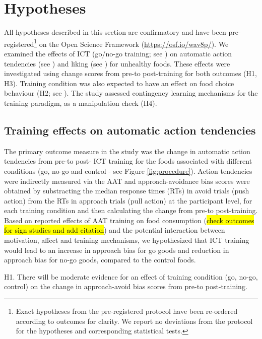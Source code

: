 \documentclass[man,floatsintext]{apa6}
\let\rmarkdownfootnote\footnote%
\def\footnote{\protect\rmarkdownfootnote}
\begin{document}
\section{Hypotheses}\label{hypotheses}

All hypotheses described in this section are confirmatory and have been
pre-registered\footnote{Exact hypotheses from the pre-registered protocol have been re-ordered according to outcomes for clarity. We report no deviations from the protocol for the hypotheses and corresponding statistical tests.}
on the Open Science Framework (\url{https://osf.io/wav8p/}). We examined
the effects of ICT (go/no-go training; see \textit{}) on
automatic action tendencies (see \textit{}) and liking (see
\textit{}) for unhealthy foods. These effects were
investigated using change scores from pre-to post-training for both
outcomes (H1, H3). Training condition was also expected to have an
effect on food choice behaviour (H2; see
\textit{}). The study assessed contingency learning
mechanisms for the training paradigm, as a manipulation check (H4).

\subsection{Training effects on automatic action
tendencies}\label{training-effects-on-automatic-action-tendencies}

The primary outcome measure in the study was the change in automatic
action tendencies from pre-to post- ICT training for the foods
associated with different conditions (go, no-go and control - see Figure
\ref{fig:procedure}). Action tendencies were indirectly measured via the
AAT and approach-avoidance bias scores were obtained by substracting the
median response times (RTs) in avoid trials (push action) from the RTs
in approach trials (pull action) at the participant level, for each
training condition and then calculating the change from pre-to
post-training. Based on reported effects of AAT training on food
consumption (\hl{check outcomes for sign studies and add citation}) and
the potential interaction between motivation, affect and training
mechanisms, we hypothesized that ICT training would lead to an increase
in approach bias for go goods and reduction in approach bias for no-go
goods, compared to the control foods.

\noindent H1. There will be moderate evidence for an effect of training
condition (go, no-go, control) on the change in approach-avoid bias
scores from pre-to post-training.
\end{document}
